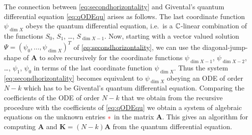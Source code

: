 \documentclass[twoside,leqno]{article}
\numberwithin{equation}{section}
\theoremstyle{plain}
\theoremstyle{definition}
\begin{document}
The connection between \eqref{eq:secondhorizontality} and Givental's quantum differential equation \eqref{eq:qODEqu} arises as follows. The last coordinate function 
$\psi_{\dim X}$ obeys the quantum differential equation, i.e.\ is a $\mathbb C$-linear combination of the functions $S_{0}$, $S_{1}$, \ldots, $S_{\dim X -1}$.  Now, starting with a  vector valued solution $\Psi = (\psi_{0}, \ldots, \psi_{\dim X})^{T}$ of \eqref{eq:secondhorizontality}, we can use the diagonal-jump-shape of $\mathbf{A}$ to solve recursively for the coordinate functions 
$\psi_{\dim X -1}$, $\psi_{\dim X - 2}$, \ldots , $\psi_{1}$, $\psi_{0}$ in terms of the 
last coordinate function $\psi_{\dim X}$. Thus the system \eqref{eq:secondhorizontality} becomes  equivalent to $\psi_{\dim X}$ obeying an ODE of order $N - k$ which has to be Givental's  quantum differential equation. Comparing the coefficients of the ODE of order  $N-k$ that we obtain from the recursive procedure with the coefficients of  \eqref{eq:qODEqu} we obtain a system of algebraic equations on the unknown entries ${\color{red}{*}}$ in the matrix $\mathbf{A}$. This gives an algorithm for computing $\mathbf{A}$ and $\mathbf{K} = (N-k) \mathbf{A}$ from the quantum differential equation.
\end{document}
